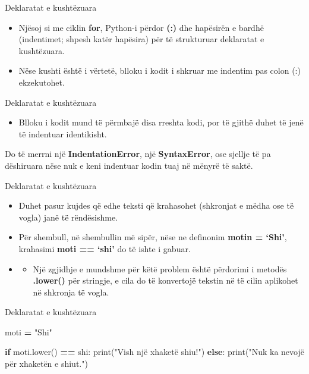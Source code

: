\documentclass[
  ignorenonframetext,
]{beamer}
\newenvironment{Shaded}{\begin{snugshade}}{\end{snugshade}}
\newcommand{\BuiltInTok}[1]{#1}
\newcommand{\ControlFlowTok}[1]{\textcolor[rgb]{0.13,0.29,0.53}{\textbf{#1}}}
\newcommand{\NormalTok}[1]{#1}
\newcommand{\OperatorTok}[1]{\textcolor[rgb]{0.81,0.36,0.00}{\textbf{#1}}}
\newcommand{\StringTok}[1]{\textcolor[rgb]{0.31,0.60,0.02}{#1}}
\providecommand{\tightlist}{%
  \setlength{\itemsep}{0pt}\setlength{\parskip}{0pt}}
\begin{document}
\begin{frame}{Deklaratat e kushtëzuara}
\protect\hypertarget{deklaratat-e-kushtuxebzuara}{}
\begin{itemize}
\item
  Njësoj si me ciklin \textbf{for}, Python-i përdor \textbf{(:)} dhe
  hapësirën e bardhë (indentimet; shpesh katër hapësira) për të
  strukturuar deklaratat e kushtëzuara.
\item
  Nëse kushti është i vërtetë, blloku i kodit i shkruar me indentim pas
  colon (:) ekzekutohet.
\end{itemize}
\end{frame}

\begin{frame}{Deklaratat e kushtëzuara}
\protect\hypertarget{deklaratat-e-kushtuxebzuara-1}{}
\begin{itemize}
\tightlist
\item
  Blloku i kodit mund të përmbajë disa rreshta kodi, por të gjithë duhet
  të jenë të indentuar identikisht.
\end{itemize}

Do të merrni një \textbf{IndentationError}, një \textbf{SyntaxError},
ose sjellje të pa dëshiruara nëse nuk e keni indentuar kodin tuaj në
mënyrë të saktë.
\end{frame}

\begin{frame}{Deklaratat e kushtëzuara}
\protect\hypertarget{deklaratat-e-kushtuxebzuara-2}{}
\begin{itemize}
\item
  Duhet pasur kujdes që edhe teksti që krahasohet (shkronjat e mëdha ose
  të vogla) janë të rëndësishme.
\item
  Për shembull, në shembullin më sipër, nëse ne definonim \textbf{motin
  = `Shi'}, krahasimi \textbf{moti == `shi'} do të ishte i gabuar.
\item
  \begin{itemize}
  \tightlist
  \item
    Një zgjidhje e mundshme për këtë problem është përdorimi i metodës
    \textbf{.lower()} për stringje, e cila do të konvertojë tekstin në
    të cilin aplikohet në shkronja të vogla.
  \end{itemize}
\end{itemize}
\end{frame}

\begin{frame}[fragile]{Deklaratat e kushtëzuara}
\protect\hypertarget{deklaratat-e-kushtuxebzuara-3}{}
\begin{Shaded}
\begin{Highlighting}[]
\NormalTok{moti }\OperatorTok{=} \StringTok{"Shi"}

\ControlFlowTok{if}\NormalTok{  moti.lower() }\OperatorTok{==} \StringTok{\textquotesingle{}shi\textquotesingle{}}\NormalTok{:}
  \BuiltInTok{print}\NormalTok{(}\StringTok{"Vish një xhaketë shiu!"}\NormalTok{)}
\ControlFlowTok{else}\NormalTok{:}
  \BuiltInTok{print}\NormalTok{(}\StringTok{"Nuk ka nevojë për xhaketën e shiut."}\NormalTok{)}
\end{Highlighting}
\end{Shaded}
\end{frame}
\end{document}

